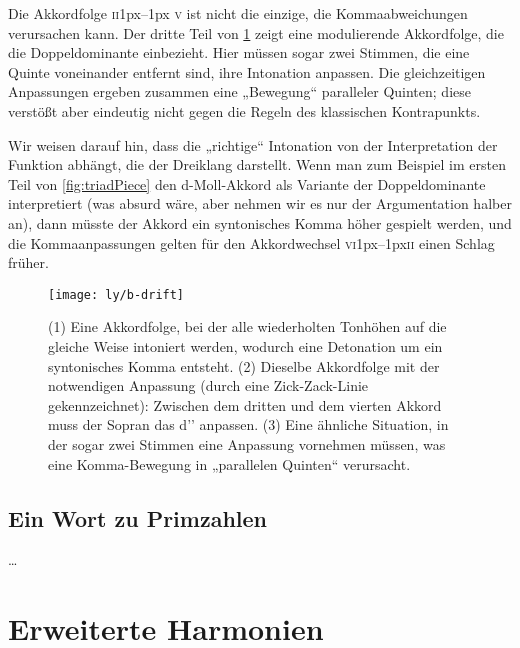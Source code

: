 \documentclass[ngerman,11pt]{scrartcl}
\begin{document}
Die Akkordfolge \textsc{ii}\kern1px–\kern1px \textsc{v} ist nicht die einzige,
die Kommaabweichungen verursachen kann. Der dritte Teil von \cref{fig:drift}
zeigt eine modulierende Akkordfolge, die die Doppeldominante einbezieht. Hier
müssen sogar zwei Stimmen, die eine Quinte voneinander entfernt sind, ihre
Intonation anpassen. Die gleichzeitigen Anpassungen ergeben zusammen eine
„Bewegung“ paralleler Quinten; diese verstößt aber eindeutig nicht gegen die
Regeln des klassischen Kontrapunkts.

Wir weisen darauf hin, dass die „richtige“ Intonation von der Interpretation der
Funktion abhängt, die der Dreiklang darstellt. Wenn man zum Beispiel im ersten
Teil von \cref{fig:triadPiece} den d-Moll-Akkord als Variante der
Doppeldominante interpretiert (was absurd wäre,
aber nehmen wir es nur der Argumentation halber an), dann müsste der Akkord ein
syntonisches Komma höher gespielt werden, und die Kommaanpassungen gelten für
den Akkordwechsel \textsc{vi}\kern1px–\kern1px\textsc{ii} einen Schlag früher.

\begin{figure}
  \centering
  \texttt{[image: ly/b-drift]}
  \caption{(1) Eine Akkordfolge, bei der alle wiederholten Tonhöhen auf die   
  	gleiche Weise intoniert werden, wodurch eine Detonation um ein syntonisches
  	Komma entsteht.%
  	\quad(2) Dieselbe Akkordfolge mit der notwendigen Anpassung (durch eine
  	Zick-Zack-Linie gekennzeichnet): Zwischen dem dritten und dem vierten Akkord
  	muss der Sopran das d’’ anpassen.%
  	\quad(3) Eine ähnliche Situation, in der sogar zwei Stimmen eine Anpassung
  	vornehmen müssen, was eine Komma-Bewegung in „parallelen Quinten“
  	verursacht.}\label{fig:drift}
\end{figure}

\subsection{Ein Wort zu Primzahlen}

…

\section{Erweiterte Harmonien}
\end{document}
